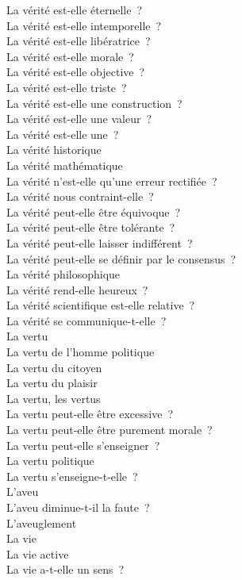 \documentclass[a4paper,12pt]{article}
\begin{document}
La vérité est-elle éternelle ? \\
La vérité est-elle intemporelle ? \\
La vérité est-elle libératrice ? \\
La vérité est-elle morale ? \\
La vérité est-elle objective ? \\
La vérité est-elle triste ? \\
La vérité est-elle une construction ? \\
La vérité est-elle une valeur ? \\
La vérité est-elle une ? \\
La vérité historique \\
La vérité mathématique \\
La vérité n'est-elle qu'une erreur rectifiée ? \\
La vérité nous contraint-elle ? \\
La vérité peut-elle être équivoque ? \\
La vérité peut-elle être tolérante ? \\
La vérité peut-elle laisser indifférent ? \\
La vérité peut-elle se définir par le consensus ? \\
La vérité philosophique \\
La vérité rend-elle heureux ? \\
La vérité scientifique est-elle relative ? \\
La vérité se communique-t-elle ? \\
La vertu \\
La vertu de l'homme politique \\
La vertu du citoyen \\
La vertu du plaisir \\
La vertu, les vertus \\
La vertu peut-elle être excessive ? \\
La vertu peut-elle être purement morale ? \\
La vertu peut-elle s'enseigner ? \\
La vertu politique \\
La vertu s'enseigne-t-elle ? \\
L'aveu \\
L'aveu diminue-t-il la faute ? \\
L'aveuglement \\
La vie \\
La vie active \\
La vie a-t-elle un sens ? \\
\end{document}
